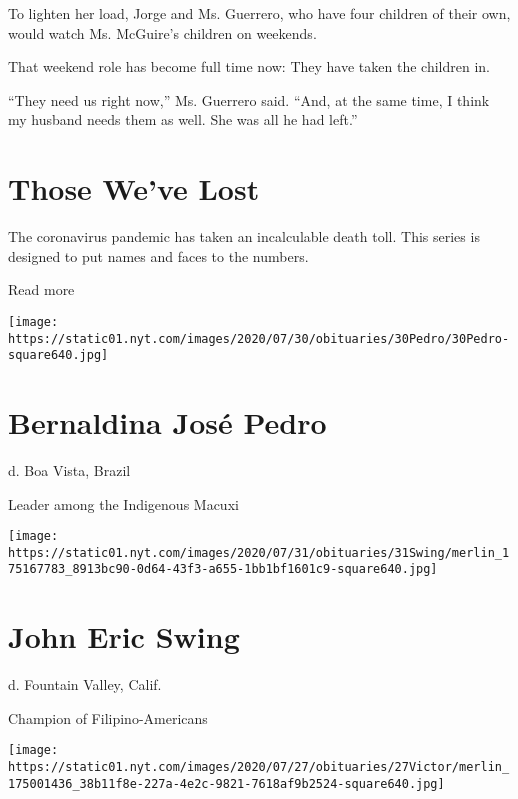 To lighten her load, Jorge and Ms. Guerrero, who have four children of
their own, would watch Ms. McGuire's children on weekends.

That weekend role has become full time now: They have taken the children
in.

``They need us right now,'' Ms. Guerrero said. ``And, at the same time,
I think my husband needs them as well. She was all he had left.''

\href{https://www.nytimes.com/interactive/2020/obituaries/people-died-coronavirus-obituaries.html?action=click\&pgtype=Article\&state=default\&region=BELOW_MAIN_CONTENT\&context=covid_obits_promo}{}

\hypertarget{those-weve-lost}{%
\section{Those We've Lost}\label{those-weve-lost}}

The coronavirus pandemic has taken an incalculable death toll. This
series is designed to put names and faces to the numbers.

Read more

\texttt{[image: https://static01.nyt.com/images/2020/07/30/obituaries/30Pedro/30Pedro-square640.jpg]}

\hypertarget{bernaldina-josuxe9-pedro}{%
\section{Bernaldina José Pedro}\label{bernaldina-josuxe9-pedro}}

d. Boa Vista, Brazil

Leader among the Indigenous Macuxi

\texttt{[image: https://static01.nyt.com/images/2020/07/31/obituaries/31Swing/merlin\_175167783\_8913bc90-0d64-43f3-a655-1bb1bf1601c9-square640.jpg]}

\hypertarget{john-eric-swing}{%
\section{John Eric Swing}\label{john-eric-swing}}

d. Fountain Valley, Calif.

Champion of Filipino-Americans

\texttt{[image: https://static01.nyt.com/images/2020/07/27/obituaries/27Victor/merlin\_175001436\_38b11f8e-227a-4e2c-9821-7618af9b2524-square640.jpg]}

